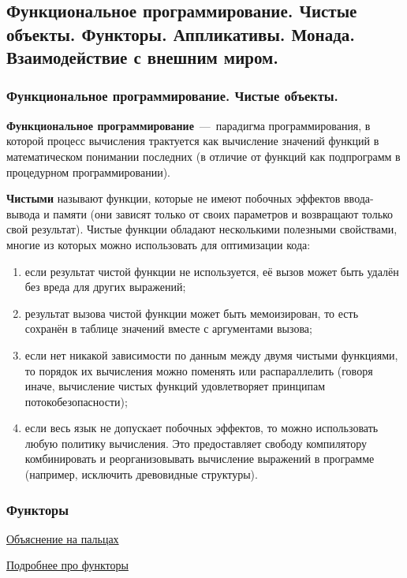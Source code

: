 \subsection{Функциональное программирование. Чистые объекты. Функторы. Аппликативы. Монада. Взаимодействие с внешним миром.}

\subsubsection{Функциональное программирование. Чистые объекты.}
\textbf{Функциональное программирование}~---~парадигма программирования, в которой процесс вычисления трактуется как вычисление значений функций в математическом понимании последних (в отличие от функций как подпрограмм в процедурном программировании).

\textbf{Чистыми} называют функции, которые не имеют побочных эффектов ввода-вывода и памяти (они зависят только от своих параметров и возвращают только свой результат). Чистые функции обладают несколькими полезными свойствами, многие из которых можно использовать для оптимизации кода:
\begin{enumerate}
	\item если результат чистой функции не используется, её вызов может быть удалён без вреда для других выражений;
	\item результат вызова чистой функции может быть мемоизирован, то есть сохранён в таблице значений вместе с аргументами вызова;
	\item если нет никакой зависимости по данным между двумя чистыми функциями, то порядок их вычисления можно поменять или распараллелить (говоря иначе, вычисление чистых функций удовлетворяет принципам потокобезопасности);
	\item если весь язык не допускает побочных эффектов, то можно использовать любую политику вычисления. Это предоставляет свободу компилятору комбинировать и реорганизовывать вычисление выражений в программе (например, исключить древовидные структуры).
\end{enumerate}

\subsubsection{Функторы}

\href{https://habr.com/ru/post/183150/}{Объяснение на пальцах}

\href{http://cmc-msu-ai.github.io/haskell-course/lecture/2013/09/07/functors.html}{Подробнее про функторы}

